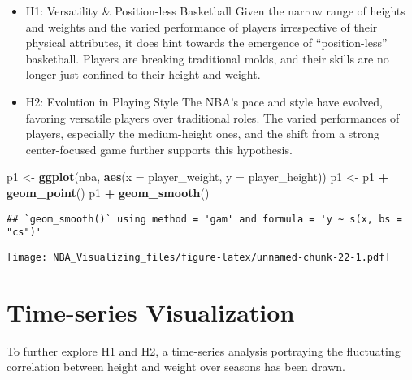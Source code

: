 \documentclass[
]{book}
\newenvironment{Shaded}{\begin{snugshade}}{\end{snugshade}}
\newcommand{\AttributeTok}[1]{\textcolor[rgb]{0.13,0.29,0.53}{#1}}
\newcommand{\FunctionTok}[1]{\textcolor[rgb]{0.13,0.29,0.53}{\textbf{#1}}}
\newcommand{\NormalTok}[1]{#1}
\newcommand{\OtherTok}[1]{\textcolor[rgb]{0.56,0.35,0.01}{#1}}
\newcommand{\SpecialCharTok}[1]{\textcolor[rgb]{0.81,0.36,0.00}{\textbf{#1}}}
\begin{document}
\begin{itemize}
\item
  H1: Versatility \& Position-less Basketball
  Given the narrow range of heights and weights and the varied performance of players irrespective of their physical attributes, it does hint towards the emergence of ``position-less'' basketball. Players are breaking traditional molds, and their skills are no longer just confined to their height and weight.
\item
  H2: Evolution in Playing Style
  The NBA's pace and style have evolved, favoring versatile players over traditional roles. The varied performances of players, especially the medium-height ones, and the shift from a strong center-focused game further supports this hypothesis.
\end{itemize}

\begin{Shaded}
\begin{Highlighting}[]
\NormalTok{p1 }\OtherTok{\textless{}{-}} \FunctionTok{ggplot}\NormalTok{(nba, }\FunctionTok{aes}\NormalTok{(}\AttributeTok{x =}\NormalTok{ player\_weight,}
    \AttributeTok{y =}\NormalTok{ player\_height))}
\NormalTok{p1 }\OtherTok{\textless{}{-}}\NormalTok{ p1 }\SpecialCharTok{+} \FunctionTok{geom\_point}\NormalTok{()}
\NormalTok{p1 }\SpecialCharTok{+} \FunctionTok{geom\_smooth}\NormalTok{()}
\end{Highlighting}
\end{Shaded}

\begin{verbatim}
## `geom_smooth()` using method = 'gam' and formula = 'y ~ s(x, bs = "cs")'
\end{verbatim}

\texttt{[image: NBA\_Visualizing\_files/figure-latex/unnamed-chunk-22-1.pdf]}

\hypertarget{time-series-visualization}{%
\section{Time-series Visualization}\label{time-series-visualization}}

To further explore H1 and H2, a time-series analysis portraying the fluctuating correlation between height and weight over seasons has been drawn.
\end{document}
